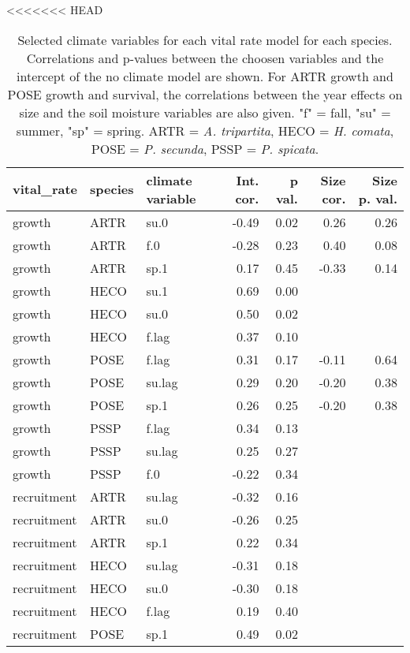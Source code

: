 <<<<<<< HEAD
\begin{table}[ht]
\centering
\caption{Selected climate variables for each vital rate model for each species. Correlations and p-values between the choosen variables and the intercept of the no climate model are shown. For ARTR growth and POSE growth and survival, the correlations between the year effects on size and the soil moisture variables are also given. "f" = fall, "su" = summer, "sp" = spring. ARTR = \textit{A. tripartita}, HECO = \textit{H. comata}, POSE = \textit{P. secunda}, PSSP = \textit{P. spicata}.} 
\label{table:strongCor}
\begin{tabular}{lllrrrr}
  \hline
vital\_rate & species & climate variable & Int. cor. & p val. & Size cor. & Size p. val. \\ 
  \hline
growth & ARTR & su.0 & -0.49 & 0.02 & 0.26 & 0.26 \\ 
  growth & ARTR & f.0 & -0.28 & 0.23 & 0.40 & 0.08 \\ 
  growth & ARTR & sp.1 & 0.17 & 0.45 & -0.33 & 0.14 \\ 
  growth & HECO & su.1 & 0.69 & 0.00 &  &  \\ 
  growth & HECO & su.0 & 0.50 & 0.02 &  &  \\ 
  growth & HECO & f.lag & 0.37 & 0.10 &  &  \\ 
  growth & POSE & f.lag & 0.31 & 0.17 & -0.11 & 0.64 \\ 
  growth & POSE & su.lag & 0.29 & 0.20 & -0.20 & 0.38 \\ 
  growth & POSE & sp.1 & 0.26 & 0.25 & -0.20 & 0.38 \\ 
  growth & PSSP & f.lag & 0.34 & 0.13 &  &  \\ 
  growth & PSSP & su.lag & 0.25 & 0.27 &  &  \\ 
  growth & PSSP & f.0 & -0.22 & 0.34 &  &  \\ 
  recruitment & ARTR & su.lag & -0.32 & 0.16 &  &  \\ 
  recruitment & ARTR & su.0 & -0.26 & 0.25 &  &  \\ 
  recruitment & ARTR & sp.1 & 0.22 & 0.34 &  &  \\ 
  recruitment & HECO & su.lag & -0.31 & 0.18 &  &  \\ 
  recruitment & HECO & su.0 & -0.30 & 0.18 &  &  \\ 
  recruitment & HECO & f.lag & 0.19 & 0.40 &  &  \\ 
  recruitment & POSE & sp.1 & 0.49 & 0.02 &  &  \\ 

\end{tabular}
\end{table}

